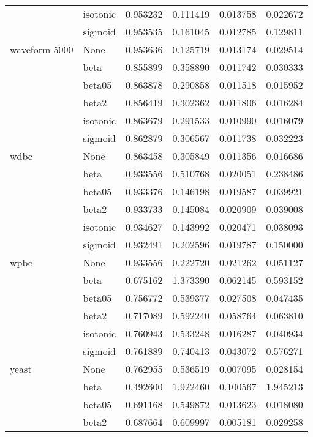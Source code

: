 \begin{tabular}{llrrrr}
        & isotonic &  0.953232 &   0.111419 &  0.013758 &  0.022672 \\
        & sigmoid &  0.953535 &   0.161045 &  0.012785 &  0.129811 \\
waveform-5000 & None &  0.953636 &   0.125719 &  0.013174 &  0.029514 \\
        & beta &  0.855899 &   0.358890 &  0.011742 &  0.030333 \\
        & beta05 &  0.863878 &   0.290858 &  0.011518 &  0.015952 \\
        & beta2 &  0.856419 &   0.302362 &  0.011806 &  0.016284 \\
        & isotonic &  0.863679 &   0.291533 &  0.010990 &  0.016079 \\
        & sigmoid &  0.862879 &   0.306567 &  0.011738 &  0.032223 \\
wdbc & None &  0.863458 &   0.305849 &  0.011356 &  0.016686 \\
        & beta &  0.933556 &   0.510768 &  0.020051 &  0.238486 \\
        & beta05 &  0.933376 &   0.146198 &  0.019587 &  0.039921 \\
        & beta2 &  0.933733 &   0.145084 &  0.020909 &  0.039008 \\
        & isotonic &  0.934627 &   0.143992 &  0.020471 &  0.038093 \\
        & sigmoid &  0.932491 &   0.202596 &  0.019787 &  0.150000 \\
wpbc & None &  0.933556 &   0.222720 &  0.021262 &  0.051127 \\
        & beta &  0.675162 &   1.373390 &  0.062145 &  0.593152 \\
        & beta05 &  0.756772 &   0.539377 &  0.027508 &  0.047435 \\
        & beta2 &  0.717089 &   0.592240 &  0.058764 &  0.063810 \\
        & isotonic &  0.760943 &   0.533248 &  0.016287 &  0.040934 \\
        & sigmoid &  0.761889 &   0.740413 &  0.043072 &  0.576271 \\
yeast & None &  0.762955 &   0.536519 &  0.007095 &  0.028154 \\
        & beta &  0.492600 &   1.922460 &  0.100567 &  1.945213 \\
        & beta05 &  0.691168 &   0.549872 &  0.013623 &  0.018080 \\
        & beta2 &  0.687664 &   0.609997 &  0.005181 &  0.029258 \\

\end{tabular}
